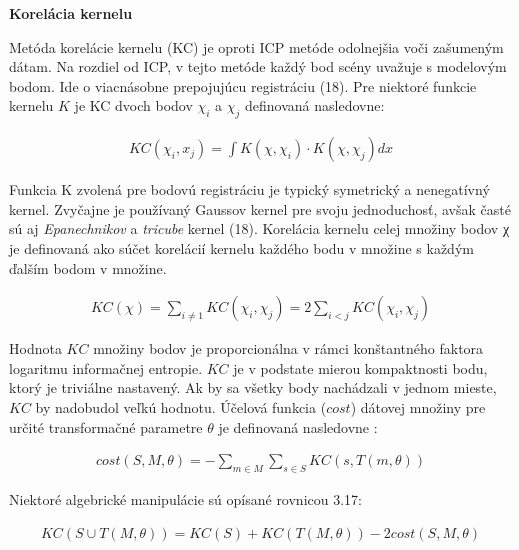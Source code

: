 \textbf{Korelácia kernelu}

Metóda korelácie kernelu (KC) je oproti ICP metóde odolnejšia voči zašumeným dátam. Na rozdiel od ICP, v tejto metóde každý bod scény uvažuje s modelovým bodom. Ide o viacnásobne prepojujúcu registráciu (18). Pre niektoré funkcie kernelu $K$ je KC dvoch bodov $\chi_i$ a $\chi_j$ definovaná nasledovne:

\begin{equation}
\label{eq14}
\begin{aligned}
KC\left(\chi_i,x_j\right)=\int K\left(\chi,\chi_i\right) \cdot K\left(\chi,\chi_j\right) dx 
\end{aligned}
\end{equation}

Funkcia K zvolená pre bodovú registráciu je typický symetrický a nenegatívný kernel. Zvyčajne je používaný Gaussov kernel pre svoju jednoduchosť, avšak časté sú aj \textit{Epanechnikov} a \textit{tricube} kernel (18). Korelácia kernelu celej množiny bodov χ je definovaná ako súčet korelácií kernelu každého bodu v množine s každým ďalším bodom v množine.


\begin{equation}
\label{eq15}
\begin{aligned}
KC\left(\chi\right) = \sum_{i\ne1} KC\left(\chi_i,\chi_j\right)=2\sum_{i<j} KC\left(\chi_i,\chi_j\right)
\end{aligned}
\end{equation}

Hodnota $KC$ množiny bodov je proporcionálna v rámci konštantného faktora logaritmu informačnej entropie. $KC$ je v podstate mierou kompaktnosti bodu, ktorý je triviálne nastavený. Ak by sa všetky body nachádzali v jednom mieste, $KC$ by nadobudol veľkú hodnotu. Účelová funkcia ($cost$) dátovej množiny pre určité transformačné parametre $\theta$ je definovaná nasledovne :

\begin{equation}
\label{eq16}
\begin{aligned}
cost\left(S,M,\theta\right)= - \sum_{m\in M} \sum_{s\in S} KC \left(s, T\left(m, \theta \right)\right)
\end{aligned}
\end{equation}

Niektoré algebrické manipulácie sú opísané rovnicou 3.17:

\begin{equation}
\label{eq17}
\begin{aligned}
KC\left(S\cup T\left(M,\theta\right)\right) = KC\left(S\right) + KC\left(T \left(M, \theta \right)\right) - 2cost\left(S,M,\theta \right)
\end{aligned}
\end{equation}

